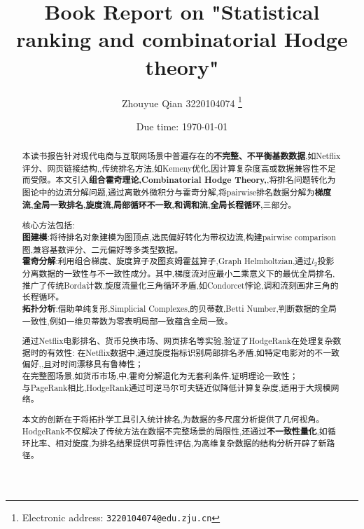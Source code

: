 \documentclass[a4paper]{article}
\begin{document}
\title{Book Report on "Statistical ranking and combinatorial Hodge theory"}

\author{Zhouyue Qian 3220104074
  \thanks{Electronic address: \texttt{3220104074@edu.zju.cn}}}


\date{Due time: \today}

\maketitle

\begin{abstract}
本读书报告针对现代电商与互联网场景中普遍存在的\textbf{不完整、不平衡基数数据},如Netflix评分、网页链接结构,,传统排名方法,如Kemeny优化,因计算复杂度高或数据兼容性不足而受限。本文引入\textbf{组合霍奇理论,Combinatorial Hodge Theory,},将排名问题转化为图论中的边流分解问题,通过离散外微积分与霍奇分解,将pairwise排名数据分解为\textbf{梯度流,全局一致排名,旋度流,局部循环不一致,和调和流,全局长程循环,}三部分。

核心方法包括:\\
\indent \textbf{图建模}:将待排名对象建模为图顶点,选民偏好转化为带权边流,构建pairwise comparison图,兼容基数评分、二元偏好等多类型数据。\\
\indent \textbf{霍奇分解}:利用组合梯度、旋度算子及图亥姆霍兹算子,Graph Helmholtzian,通过$l_2$投影分离数据的一致性与不一致性成分。其中,梯度流对应最小二乘意义下的最优全局排名,推广了传统Borda计数,旋度流量化三角循环矛盾,如Condorcet悖论,调和流刻画非三角的长程循环。\\
\indent \textbf{拓扑分析}:借助单纯复形,Simplicial Complexes,的贝蒂数,Betti Number,判断数据的全局一致性,例如一维贝蒂数为零表明局部一致蕴含全局一致。

通过Netflix电影排名、货币兑换市场、网页排名等实验,验证了HodgeRank在处理复杂数据时的有效性:
\indent  在Netflix数据中,通过旋度指标识别局部排名矛盾,如特定电影对的不一致偏好,,且对时间漂移具有鲁棒性；\\
\indent 在完整图场景,如货币市场,中,霍奇分解退化为无套利条件,证明理论一致性；\\
\indent 与PageRank相比,HodgeRank通过可逆马尔可夫链近似降低计算复杂度,适用于大规模网络。

本文的创新在于将拓扑学工具引入统计排名,为数据的多尺度分析提供了几何视角。HodgeRank不仅解决了传统方法在数据不完整场景的局限性,还通过\textbf{不一致性量化},如循环比率、相对旋度,为排名结果提供可靠性评估,为高维复杂数据的结构分析开辟了新路径。

\end{abstract}
\end{document}
